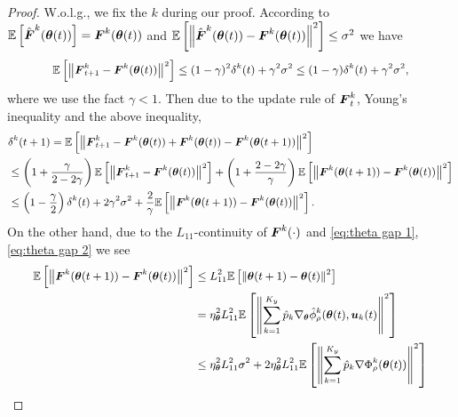 \begin{proof}
	W.o.l.g., we fix the $k$ during our proof. According to $\mathbb{E}\left[\hat{\boldsymbol{F}}^{k}(\text{\boldmath{$\theta$}}(t))\right] = \boldsymbol{F}^{k}(\text{\boldmath{$\theta$}}(t))$ and $\mathbb{E}\left[\left\|\hat{\boldsymbol{F}}^{k}(\text{\boldmath{$\theta$}}(t)) - \boldsymbol{F}^{k}(\text{\boldmath{$\theta$}}(t))\right\|^{2}\right]\leq \sigma^{2}$ we have 
	\begin{equation}
		\small
		\begin{aligned}
			\mE\left[\left\|\bF_{t + 1}^{k} - \bF^{k}(\btheta(t))\right\|^{2}\right] \leq (1 - \gamma)^{2}\delta^{k}(t) + \gamma^{2}\sigma^{2}\leq (1 - \gamma)\delta^{k}(t) + \gamma^{2}\sigma^{2}, 
		\end{aligned}
	\end{equation}
	where we use the fact $\gamma < 1$. Then due to the update rule of $\boldsymbol{F}_{t}^{k}$, Young's inequality and the above inequality,  
	\begin{equation}
		\small
		\begin{aligned}
			& \delta^{k}(t + 1) = \mE\left[\left\|\bF_{t + 1}^{k} - \bF^{k}(\btheta(t)) + \bF^{k}(\btheta(t)) - \bF^{k}(\btheta(t + 1))\right\|^{2}\right] \\
			& \leq \left(1 + \frac{\gamma}{2 - 2\gamma}\right)\mE\left[\left\|\bF_{t + 1}^{k} - \bF^{k}(\btheta(t))\right\|^{2}\right] + \left(1 + \frac{2 - 2\gamma}{\gamma}\right)\mE\left[\left\|\bF^{k}(\btheta(t + 1)) - \bF^{k}(\btheta(t))\right\|^{2}\right] \\
			& \leq \left(1 - \frac{\gamma}{2}\right)\delta^{k}(t) + 2\gamma^{2}\sigma^{2} +  \frac{2}{\gamma}\mE\left[\left\|\bF^{k}(\btheta(t + 1)) - \bF^{k}(\btheta(t))\right\|^{2}\right].
		\end{aligned}
	\end{equation}
	On the other hand, due to the $L_{11}$-continuity of $\boldsymbol{F}^{k}(\cdot)$ and \eqref{eq:theta gap 1}, \eqref{eq:theta gap 2} we see 
	\begin{equation}
		\small
		\begin{aligned}
			\mE\left[\left\|\bF^{k}(\btheta(t + 1)) - \bF^{k}(\btheta(t))\right\|^{2}\right] & \leq L_{11}^{2}\mE\left[\left\|\btheta(t + 1) - \btheta(t)\right\|^{2}\right] \\
			& = \eta_{\btheta}^{2}L_{11}^{2}\mE\left[\left\|\sum\limits_{k = 1}^{K_{y}}\hat{p}_{k}\nabla_{\btheta}\hat{\phi}_{\rho}^{k}(\btheta(t), \bu_{k}(t)\right\|^{2}\right] \\
			& \leq \eta_{\btheta}^{2}L_{11}^{2}\sigma^{2} + 2\eta_{\btheta}^{2}L_{11}^{2}\mE\left[\left\|\sum\limits_{k = 1}^{K_{y}}\hat{p}_{k}\nabla\Phi_{\rho}^{k}(\btheta(t))\right\|^{2}\right]\\

\end{aligned}
\end{equation}
\end{proof}
